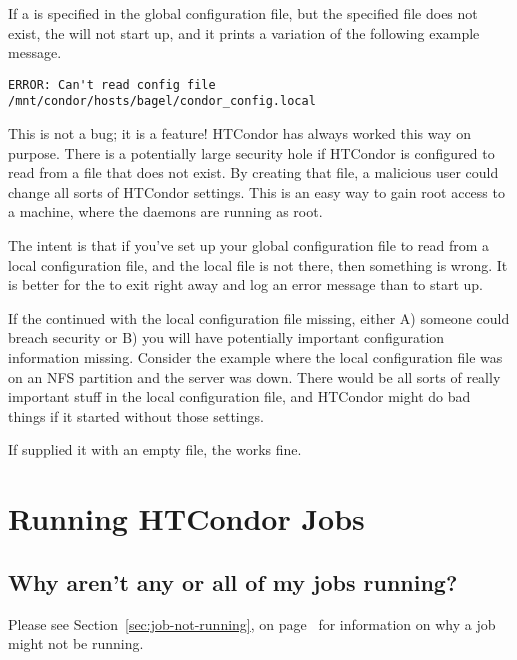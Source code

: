 If a  
is specified in the global configuration file,
but the specified file does not exist,
the  will not start up, and it prints a variation
of the following example message.

\footnotesize
\begin{verbatim}
ERROR: Can't read config file /mnt/condor/hosts/bagel/condor_config.local
\end{verbatim}
\normalsize

This is not a bug; it is a feature!
HTCondor has always worked this way on purpose.
There is a potentially
large security hole if HTCondor is configured to read from a file that
does not exist.
By creating that file, a malicious user could
change all sorts of HTCondor settings.
This is an easy way
to gain root access to a machine,
where the daemons are running as root.

The intent is that
if you've set up your global configuration file to read
from a local configuration file, and the local file is not there,
then something is wrong.
It is better for the  to exit right away and
log an error message than to start up.

If the  continued with the local configuration file
missing, either A) someone could breach security or B) you will have
potentially important configuration information missing.
Consider the example where the local configuration file was on an NFS
partition and the server was down. 
There would be all sorts of
really important stuff in the local configuration file,
and HTCondor might do bad things if it started without those settings.  

If supplied it with an empty file, the  works fine.



\section{Running HTCondor Jobs}

\subsection*{Why aren't any or all of my jobs running?}

Please see 
Section~\ref{sec:job-not-running}, on page~\pageref{sec:job-not-running}
for information on why a job might not be running.



